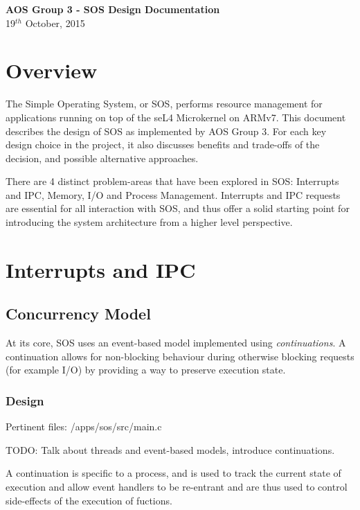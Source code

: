 \documentclass[a4paper,12pt]{article}
\begin{document}
\renewcommand{\headheight}{15pt}
\setlength{\parskip}{\baselineskip}%
\setlength{\parindent}{0pt}%
  \begin{center}
    \vspace*{60mm}
    {\Large \bfseries{AOS Group 3 - SOS Design Documentation}}\\[8mm]
    19$^{th}$ October, 2015\\[20mm]
  \end{center}
\newpage
\tableofcontents
\newpage
\section{Overview}
The Simple Operating System, or SOS, performs resource management for
applications running on top of the seL4 Microkernel on ARMv7.  This document
describes the design of SOS as implemented by AOS Group 3.  For each key
design choice in the project, it also discusses benefits and trade-offs of the
decision, and possible alternative approaches.

There are 4 distinct problem-areas that have been explored in SOS: Interrupts
and IPC, Memory, I/O and Process Management.  Interrupts and IPC requests are
essential for all interaction with SOS, and thus offer a solid starting point
for introducing the system architecture from a higher level perspective.

\section{Interrupts and IPC}
\subsection{Concurrency Model}
At its core, SOS uses an event-based model implemented using
\emph{continuations}.  A continuation allows for non-blocking behaviour during
otherwise blocking requests (for example I/O) by providing a way to preserve
execution state.

\subsubsection{Design}
Pertinent files: /apps/sos/src/main.c

TODO: Talk about threads and event-based models, introduce continuations.

A continuation is specific to a process, and is used to track the current
state of execution and allow event handlers to be re-entrant and are thus used
to control side-effects of the execution of fuctions.
\end{document}
